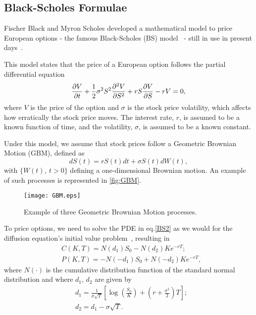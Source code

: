 \subsection{Black-Scholes Formulae}
Fischer Black and Myron Scholes developed a mathematical model to price European options - the famous Black-Scholes (BS) model~\citep{Scholes} - still in use in present days~\citep{Wilmott3}.

This model states that the price of a European option follows the partial differential equation
\begin{equation}\label{BS2}
\pdv{V}{t}+\frac{1}{2}\sigma^2S^2\pdv{^2V}{S^2}+rS\pdv{V}{S}-rV=0,
\end{equation}
\noindent where $V$ is the price of the option and $\sigma$ is the stock price volatility, which affects how erratically the stock price moves. The interest rate, $r$, is assumed to be a known function of time, and the volatility, $\sigma$, is assumed to be a known constant.

Under this model, we assume that stock prices follow a Geometric Brownian Motion (GBM), defined as
\begin{equation}\label{GBM}
dS(t)=rS(t)dt+\sigma S(t)dW(t),
\end{equation}
\noindent with $\{W(t),\ t>0\}$ defining a one-dimensional Brownian motion. An example of such processes is represented in \autoref{fig:GBM}.

\begin{figure}[H]
    \centering
      \texttt{[image: GBM.eps]}
      \caption{Example of three Geometric Brownian Motion processes.}\label{fig:GBM}
    \end{figure}
    
To price options, we need to solve the PDE in eq.\eqref{BS2} as we would for the diffusion equation's initial value problem~\citep{Dilao}, resulting in
\begin{subequations}\label{callputBS}
\begin{align}
&C(K,T)=N(d_1)S_0-N(d_2)Ke^{-rT};\\
&P(K,T)=-N(-d_1)S_0+N(-d_2)Ke^{-rT},
\end{align}
\end{subequations}
\noindent where $N(\cdot)$ is the cumulative distribution function of the standard normal distribution and where $d_1$, $d_2$ are given by
\begin{subequations}\label{d1d2}
\begin{align}
&d_1=\frac{1}{\sigma\sqrt{T}}\left[\log\left(\frac{S_0}{K}\right)+\left(r+\frac{\sigma^2}{2}\right)T\right];\\
&d_2=d_1-\sigma\sqrt{T}.
\end{align}
\end{subequations}


